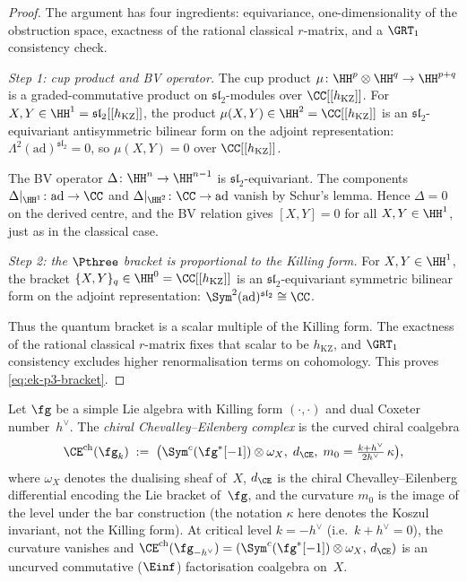 \begin{proof}
The argument has four ingredients: equivariance,
one-dimensionality of the obstruction space,
exactness of the rational classical $r$-matrix, and a
$\GRT_1$ consistency check.

\textit{Step 1: cup product and BV operator.}
The cup product $\mu \colon \HH^p \otimes \HH^q
\to \HH^{p+q}$ is a graded-commutative product on
$\mathfrak{sl}_2$-modules over $\CC[[h_{\mathrm{KZ}}]]$.
For $X, Y \in \HH^1
= \mathfrak{sl}_2[[h_{\mathrm{KZ}}]]$,
the product $\mu(X, Y) \in \HH^2
= \CC[[h_{\mathrm{KZ}}]]$
is an $\mathfrak{sl}_2$-equivariant antisymmetric
bilinear form on the adjoint representation:
$\Lambda^2(\mathrm{ad})^{\mathfrak{sl}_2} = 0$,
so $\mu(X, Y) = 0$ over $\CC[[h_{\mathrm{KZ}}]]$.

The BV operator $\Delta \colon \HH^n \to \HH^{n-1}$
is $\mathfrak{sl}_2$-equivariant. The components
$\Delta|_{\HH^1} \colon \mathrm{ad} \to \CC$ and
$\Delta|_{\HH^2} \colon \CC \to \mathrm{ad}$ vanish
by Schur's lemma. Hence $\Delta = 0$ on the derived
centre, and the BV relation gives
$[X, Y] = 0$ for all $X, Y \in \HH^1$, just as in the
classical case.

\textit{Step 2: the $\Pthree$ bracket is proportional
to the Killing form.}
For $X, Y \in \HH^1$, the bracket
$\{X, Y\}_q \in \HH^0 = \CC[[h_{\mathrm{KZ}}]]$ is an
$\mathfrak{sl}_2$-equivariant symmetric bilinear
form on the adjoint representation:
$\Sym^2(\mathrm{ad})^{\mathfrak{sl}_2} \cong \CC$.

Thus the quantum bracket is a scalar multiple of the Killing form.
The exactness of the rational classical $r$-matrix fixes that scalar
to be $h_{\mathrm{KZ}}$, and $\GRT_1$ consistency excludes higher
renormalisation terms on cohomology. This proves
\eqref{eq:ek-p3-bracket}.
\end{proof}


\begin{definition}
\label{def:chiral-ce-complex}
Let $\fg$ be a simple Lie algebra with Killing form
$(\cdot, \cdot)$ and dual Coxeter number~$h^\vee$.
The \emph{chiral Chevalley--Eilenberg complex} is
the curved chiral coalgebra
\begin{equation}\label{eq:chiral-ce-complex}
 \CE^{\mathrm{ch}}(\fg_k)
 \;:=\;
 \bigl(\Sym^c(\fg^*[-1]) \otimes \omega_X,\;
 d_{\CE},\; m_0 = \tfrac{k + h^\vee}{2h^\vee}\,\kappa\bigr),
\end{equation}
where $\omega_X$ denotes the dualising sheaf of~$X$,
$d_{\CE}$ is the chiral Chevalley--Eilenberg differential
encoding the Lie bracket of~$\fg$, and the curvature
$m_0$ is the image of the level under the bar construction
(the notation $\kappa$ here denotes the Koszul invariant,
not the Killing form).
At critical level $k = -h^\vee$ (i.e.\ $k + h^\vee = 0$), the
curvature vanishes and
$\CE^{\mathrm{ch}}(\fg_{-h^\vee}) = (\Sym^c(\fg^*[-1]) \otimes
\omega_X,\, d_{\CE})$
is an uncurved commutative ($\Einf$) factorisation
coalgebra on~$X$.
\end{definition}

